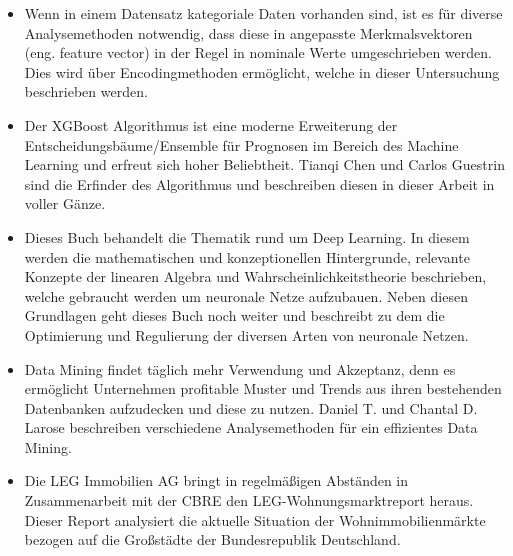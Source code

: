 \begin{itemize}
    \item Wenn in einem Datensatz kategoriale Daten vorhanden sind, ist es für 
    diverse Analysemethoden notwendig, dass diese in angepasste Merkmalsvektoren 
    (eng. feature vector) in der Regel in nominale Werte umgeschrieben werden.
    Dies wird über Encodingmethoden ermöglicht, welche in dieser Untersuchung
    beschrieben werden.
\end{itemize}

\begin{itemize}
    \item Der XGBoost Algorithmus ist eine moderne Erweiterung der 
    Entscheidungsbäume/Ensemble für Prognosen im Bereich des Machine Learning und 
    erfreut sich hoher Beliebtheit. Tianqi Chen und Carlos Guestrin sind die Erfinder 
    des Algorithmus und beschreiben diesen in dieser Arbeit in voller Gänze.
\end{itemize}
\newpage
{}
\begin{itemize}
    \item Dieses Buch behandelt die Thematik rund um Deep Learning. In diesem werden die
    mathematischen und konzeptionellen Hintergrunde, relevante Konzepte der 
    linearen Algebra und Wahrscheinlichkeitstheorie beschrieben, welche gebraucht werden um neuronale
    Netze aufzubauen. Neben diesen Grundlagen geht dieses Buch noch weiter und beschreibt zu dem
    die Optimierung und Regulierung der diversen Arten von neuronale Netzen.
\end{itemize}

\begin{itemize}
    \item Data Mining findet täglich mehr Verwendung und Akzeptanz, denn es ermöglicht Unternehmen 
    profitable Muster und Trends aus ihren bestehenden Datenbanken aufzudecken und diese zu
    nutzen. Daniel T. und Chantal D. Larose beschreiben verschiedene Analysemethoden für
    ein effizientes Data Mining.
\end{itemize}

\begin{itemize}
    \item Die LEG Immobilien AG bringt in regelmäßigen Abständen in Zusammenarbeit mit der 
    CBRE den LEG-Wohnungsmarktreport heraus. Dieser Report analysiert die aktuelle Situation 
    der Wohnimmobilienmärkte bezogen auf die Großstädte der Bundesrepublik Deutschland.
\end{itemize}

